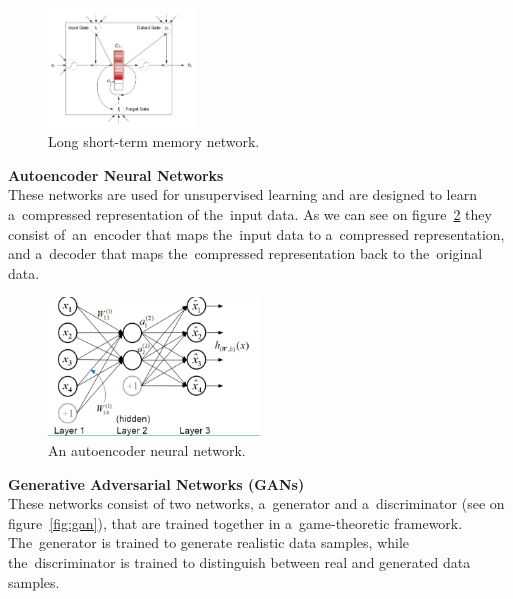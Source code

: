     \begin{center}
        \begin{figure}[!ht]
            \centering
            \includegraphics[width=0.35\textwidth]{figures/ltmn}
            \caption{Long short-term memory network. \cite{cheng2016long}}
            \label{fig:ltmn}
        \end{figure}
    \end{center}
\newpage
\textbf{Autoencoder Neural Networks}\\
These networks are used for unsupervised learning and are designed to learn a~compressed representation of the~input data. As we can see on figure~\ref{fig:ann} they consist of~an~encoder that maps the~input data to a~compressed representation, and a~decoder that maps the~compressed representation back to the~original data.
    \begin{center}
        \begin{figure}[!ht]
            \centering
            \includegraphics[width=0.5\textwidth]{figures/ann}
            \caption{An autoencoder neural network. \cite{luo2018distributed}}
            \label{fig:ann}
        \end{figure}
    \end{center}
\textbf{Generative Adversarial Networks (GANs)}\\
These networks consist of two networks, a~generator and a~discriminator (see on figure~\ref{fig:gan}), that are trained together in a~game-theoretic framework. The~generator is trained to generate realistic data samples, while the~discriminator is trained to distinguish between real and generated data samples.
